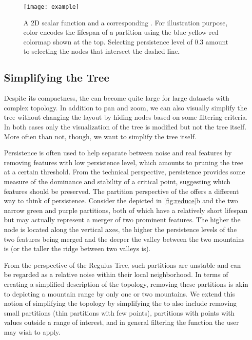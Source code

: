 \begin{figure}[tb]
    \begin{center}
    \texttt{[image: example]}
    \caption{A 2D scalar function and a corresponding \RT. For illustration purpose, color encodes the lifespan of a partition using the blue-yellow-red colormap shown at the top. Selecting persistence level of 0.3 amount to selecting the nodes that intersect the dashed line.}
    \label{fig:regulus-tree}
    \end{center}
\end{figure}

\subsection{Simplifying the Tree}
\label{sec:filtering}
Despite its compactness, the \RT can become quite large for large datasets with complex topology. In addition to pan and zoom, we can also visually simplify the tree without changing the layout by hiding nodes based on some filtering criteria. In both cases only the visualization of the tree is modified but not the tree itself. More often than not, though, we want to simplify the tree itself.

Persistence is often used to help separate between noise and real features by removing features with low persistence level, which amounts to pruning the tree at a certain  threshold. From the technical perspective, persistence provides some measure of the dominance and stability of a critical point, suggesting which features should be preserved. The partition perspective of the \RT offers a different way to think of persistence. Consider the \RT depicted in \autoref{fig:reduce}b and the two narrow green and purple partitions, both of which have a relatively short lifespan but may actually represent a merger of two prominent features. The higher the node is located along the vertical axes, the higher the persistence levels of the two features being merged and the deeper the valley between the two mountains is (or the taller the ridge between two valleys is). 

From the perspective of the Regulus Tree, such partitions are unstable and can be regarded as a relative noise within their local neighborhood. In terms of creating a simplified description of the topology, removing these partitions is akin to depicting a mountain range by only one or two mountains. We  extend this notion of simplifying the topology by simplifying the \RT to also include removing small partitions (thin partitions with few points), partitions with points with values outside a range of interest, and in general filtering the function the user may wish to apply.

